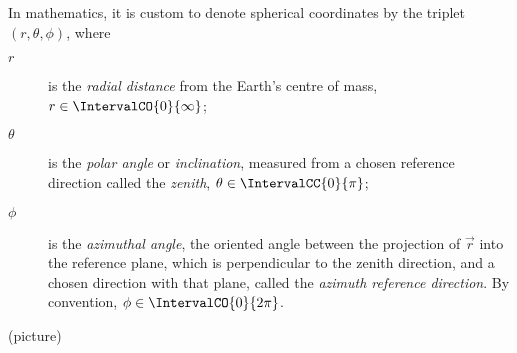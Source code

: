         In mathematics, it is custom to denote spherical coordinates by the triplet
        $(r, \theta, \phi)$, where
        \begin{description}
            \item[$r$] is the \emph{radial distance} from the Earth's centre of mass,
                $r \in \IntervalCO{0}{\infty}$;
            \item[$\theta$] is the \emph{polar angle} or \emph{inclination}, measured
                from a chosen reference direction called the \textit{zenith},
                $\theta \in \IntervalCC{0}{\pi}$;
            \item[$\phi$] is the \emph{azimuthal angle}, the oriented angle between the projection
                of $\vec{r}$ into the reference plane, which is perpendicular to the zenith direction, and
                a chosen direction with that plane, called the \textit{azimuth reference direction}.
                By convention, $\phi \in \IntervalCO{0}{2\pi}$.
        \end{description}

        (picture)

